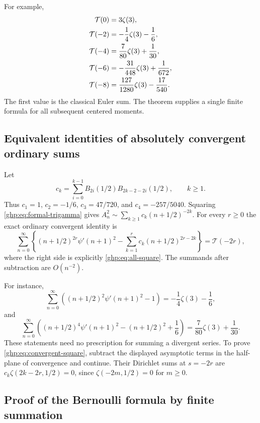 \documentclass[11pt,a4paper]{article}
\numberwithin{equation}{section}
\theoremstyle{definition}
\theoremstyle{remark}
\begin{document}
For example,
\begin{align}\label{ghp:eq:square-table}
 \mathcal T(0)&=3\zeta(3),\notag\\
 \mathcal T(-2)&=-\frac14\zeta(3)-\frac16,\notag\\
 \mathcal T(-4)&=\frac7{80}\zeta(3)+\frac1{30},\notag\\
 \mathcal T(-6)&=-\frac{31}{448}\zeta(3)+\frac1{672},\notag\\
 \mathcal T(-8)&=\frac{127}{1280}\zeta(3)-\frac{17}{540}.
\end{align}
The first value is the classical Euler sum. The theorem supplies a
single finite formula for all subsequent centered moments.

\subsection{Equivalent identities of absolutely convergent ordinary sums}

Let
\begin{equation}\label{ghp:def:ck}
 c_k=\sum_{i=0}^{k-1}B_{2i}(1/2)B_{2k-2-2i}(1/2),\qquad k\geq1.
\end{equation}
Thus $c_1=1$, $c_2=-1/6$, $c_3=47/720$, and
$c_4=-257/5040$. Squaring \eqref{ghp:eq:formal-trigamma} gives
$A_n^2\sim\sum_{k\geq1}c_k(n+1/2)^{-2k}$.
For every $r\geq0$ the exact ordinary convergent identity is
\begin{equation}\label{ghp:eq:convergent-square}
 \sum_{n=0}^{\infty}\left\{(n+1/2)^{2r}\psi'(n+1)^2
       -\sum_{k=1}^r c_k(n+1/2)^{2r-2k}\right\}
       =\mathcal T(-2r),
\end{equation}
where the right side is explicitly \eqref{ghp:eq:all-square}. The
summands after subtraction are $O(n^{-2})$.

For instance,
\[
 \sum_{n=0}^{\infty}\left((n+1/2)^2\psi'(n+1)^2-1\right)
       =-\frac14\zeta(3)-\frac16,
\]
and
\[
 \sum_{n=0}^{\infty}\left((n+1/2)^4\psi'(n+1)^2
                         -(n+1/2)^2+\frac16\right)
       =\frac7{80}\zeta(3)+\frac1{30}.
\]
These statements need no prescription for summing a divergent series.
To prove \eqref{ghp:eq:convergent-square}, subtract the displayed
asymptotic terms in the half-plane of convergence and continue. Their
Dirichlet sums at $s=-2r$ are
$c_k\zeta(2k-2r,1/2)=0$, since
$\zeta(-2m,1/2)=0$ for $m\geq0$.

\subsection{Proof of the Bernoulli formula by finite summation}
\end{document}
